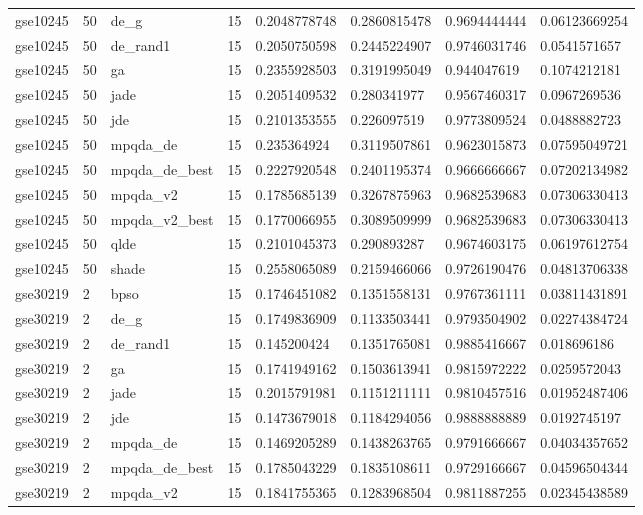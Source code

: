 \begin{table}[t]
\begin{tabular}{llllllll}
gse10245 & 50 & de\_g & 15 & 0.2048778748 & 0.2860815478 & 0.9694444444 & 0.06123669254 \\
gse10245 & 50 & de\_rand1 & 15 & 0.2050750598 & 0.2445224907 & 0.9746031746 & 0.0541571657 \\
gse10245 & 50 & ga & 15 & 0.2355928503 & 0.3191995049 & 0.944047619 & 0.1074212181 \\
gse10245 & 50 & jade & 15 & 0.2051409532 & 0.280341977 & 0.9567460317 & 0.0967269536 \\
gse10245 & 50 & jde & 15 & 0.2101353555 & 0.226097519 & 0.9773809524 & 0.0488882723 \\
gse10245 & 50 & mpqda\_de & 15 & 0.235364924 & 0.3119507861 & 0.9623015873 & 0.07595049721 \\
gse10245 & 50 & mpqda\_de\_best & 15 & 0.2227920548 & 0.2401195374 & 0.9666666667 & 0.07202134982 \\
gse10245 & 50 & mpqda\_v2 & 15 & 0.1785685139 & 0.3267875963 & 0.9682539683 & 0.07306330413 \\
gse10245 & 50 & mpqda\_v2\_best & 15 & 0.1770066955 & 0.3089509999 & 0.9682539683 & 0.07306330413 \\
gse10245 & 50 & qlde & 15 & 0.2101045373 & 0.290893287 & 0.9674603175 & 0.06197612754 \\
gse10245 & 50 & shade & 15 & 0.2558065089 & 0.2159466066 & 0.9726190476 & 0.04813706338 \\
gse30219 & 2 & bpso & 15 & 0.1746451082 & 0.1351558131 & 0.9767361111 & 0.03811431891 \\
gse30219 & 2 & de\_g & 15 & 0.1749836909 & 0.1133503441 & 0.9793504902 & 0.02274384724 \\
gse30219 & 2 & de\_rand1 & 15 & 0.145200424 & 0.1351765081 & 0.9885416667 & 0.018696186 \\
gse30219 & 2 & ga & 15 & 0.1741949162 & 0.1503613941 & 0.9815972222 & 0.0259572043 \\
gse30219 & 2 & jade & 15 & 0.2015791981 & 0.1151211111 & 0.9810457516 & 0.01952487406 \\
gse30219 & 2 & jde & 15 & 0.1473679018 & 0.1184294056 & 0.9888888889 & 0.0192745197 \\
gse30219 & 2 & mpqda\_de & 15 & 0.1469205289 & 0.1438263765 & 0.9791666667 & 0.04034357652 \\
gse30219 & 2 & mpqda\_de\_best & 15 & 0.1785043229 & 0.1835108611 & 0.9729166667 & 0.04596504344 \\
gse30219 & 2 & mpqda\_v2 & 15 & 0.1841755365 & 0.1283968504 & 0.9811887255 & 0.02345438589 \\

\end{tabular}
\end{table}
